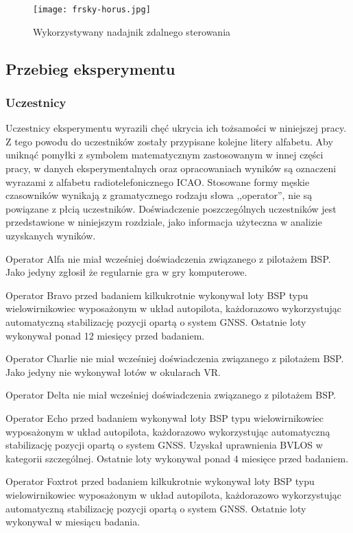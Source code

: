 \begin{figure}[!h]
    \centering \texttt{[image: frsky-horus.jpg]}
    \caption{Wykorzystywany nadajnik zdalnego sterowania}
    \label{fig:frsky-horus}
\end{figure}

\subsection{Przebieg eksperymentu}

\subsubsection{Uczestnicy}
Uczestnicy eksperymentu wyrazili chęć ukrycia ich tożsamości w niniejszej pracy. Z tego powodu do uczestników zostały przypisane kolejne litery alfabetu. Aby uniknąć pomyłki z symbolem matematycznym zastosowanym w innej części pracy, w danych eksperymentalnych oraz opracowaniach wyników są oznaczeni wyrazami z alfabetu radiotelefonicznego ICAO. Stosowane formy męskie czasowników wynikają z gramatycznego rodzaju słowa ,,operator'', nie są powiązane z płcią uczestników. Doświadczenie poszczególnych uczestników jest przedstawione w niniejszym rozdziale, jako informacja użyteczna w analizie uzyskanych wyników.

Operator Alfa nie miał wcześniej doświadczenia związanego z pilotażem BSP. Jako jedyny zgłosił że regularnie gra w gry komputerowe.

Operator Bravo przed badaniem kilkukrotnie wykonywał loty BSP typu wielowirnikowiec wyposażonym w układ autopilota, każdorazowo wykorzystując automatyczną stabilizację pozycji opartą o system GNSS. Ostatnie loty wykonywał ponad 12 miesięcy przed badaniem.

Operator Charlie nie miał wcześniej doświadczenia związanego z pilotażem BSP. Jako jedyny nie wykonywał lotów w okularach VR.

Operator Delta nie miał wcześniej doświadczenia związanego z pilotażem BSP.

Operator Echo przed badaniem wykonywał loty BSP typu wielowirnikowiec wyposażonym w układ autopilota, każdorazowo wykorzystując automatyczną stabilizację pozycji opartą o system GNSS. Uzyskał uprawnienia BVLOS w kategorii szczególnej. Ostatnie loty wykonywał ponad 4 miesięce przed badaniem.

Operator Foxtrot przed badaniem kilkukrotnie wykonywał loty BSP typu wielowirnikowiec wyposażonym w układ autopilota, każdorazowo wykorzystując automatyczną stabilizację pozycji opartą o system GNSS. Ostatnie loty wykonywał w miesiącu badania.

